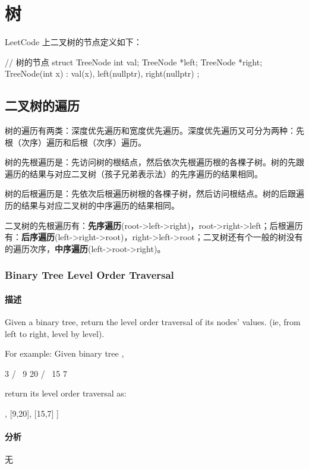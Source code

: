 \chapter{树}

LeetCode 上二叉树的节点定义如下：
\begin{Code}
// 树的节点
struct TreeNode {
    int val;
    TreeNode *left;
    TreeNode *right;
    TreeNode(int x) : val(x), left(nullptr), right(nullptr) { }
};
\end{Code}


\section{二叉树的遍历} %

树的遍历有两类：深度优先遍历和宽度优先遍历。深度优先遍历又可分为两种：先根（次序）遍历和后根（次序）遍历。

树的先根遍历是：先访问树的根结点，然后依次先根遍历根的各棵子树。树的先跟遍历的结果与对应二叉树（孩子兄弟表示法）的先序遍历的结果相同。

树的后根遍历是：先依次后根遍历树根的各棵子树，然后访问根结点。树的后跟遍历的结果与对应二叉树的中序遍历的结果相同。

二叉树的先根遍历有：\textbf{先序遍历}(root->left->right)，root->right->left；后根遍历有：\textbf{后序遍历}(left->right->root)，right->left->root；二叉树还有个一般的树没有的遍历次序，\textbf{中序遍历}(left->root->right)。


\subsection{Binary Tree Level Order Traversal}
\label{sec:binary-tree-tevel-order-traversal}


\subsubsection{描述}
Given a binary tree, return the level order traversal of its nodes' values. (ie, from left to right, level by level).

For example:
Given binary tree ,
\begin{Code}
    3
   / \
  9  20
    /  \
   15   7
\end{Code}
return its level order traversal as:
\begin{Code}
[
  [3],
  [9,20],
  [15,7]
]
\end{Code}


\subsubsection{分析}
无


